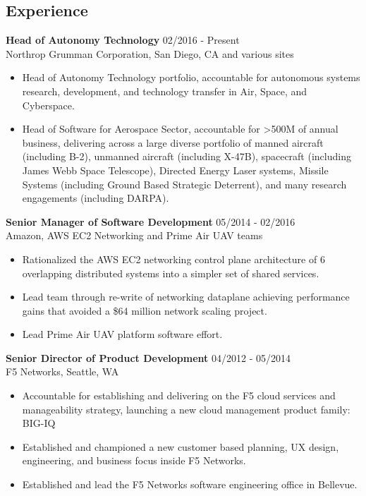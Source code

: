 \begin{resume} 
 

\section{Experience}
 {\bf Head of Autonomy Technology} \hfill 02/2016 - Present\\
 Northrop Grumman Corporation, San Diego, CA and various sites\\
 \begin{itemize} \itemsep -2pt 
 \item Head of Autonomy Technology portfolio, accountable for autonomous systems research, development, and technology transfer in Air, Space, and Cyberspace.
  \item Head of Software for Aerospace Sector, accountable for >500M of annual business, delivering across a large diverse portfolio of manned aircraft (including B-2), unmanned aircraft (including X-47B), spacecraft (including James Webb Space Telescope), Directed Energy Laser systems, Missile Systems (including Ground Based Strategic Deterrent), and many research engagements (including DARPA).
 \end{itemize}

 {\bf Senior Manager of Software Development} \hfill 05/2014 - 02/2016\\
 Amazon, AWS EC2 Networking and Prime Air UAV teams\\
 \begin{itemize} \itemsep -2pt  %
 \item Rationalized the AWS EC2 networking control plane architecture of 6 overlapping distributed systems into a simpler set of shared services.
 \item Lead team through re-write of networking dataplane achieving performance gains that avoided a \$64 million network scaling project.
 \item Lead Prime Air UAV platform software effort.
 \end{itemize}

 {\bf Senior Director of Product Development} \hfill 04/2012 - 05/2014\\
 F5 Networks, Seattle, WA
 \begin{itemize} \itemsep -2pt
 \item Accountable for establishing and delivering on the F5 cloud services and manageability strategy, launching a new cloud management product family: BIG-IQ
 \item Established and championed a new customer based planning, UX design, engineering, and business focus inside F5 Networks.
 \item Established and lead the F5 Networks software engineering office in Bellevue.
 \end{itemize}
 

\end{resume}
